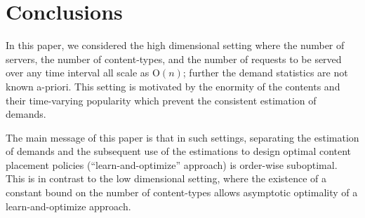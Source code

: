 \documentclass[10pt, conference, letterpaper]{IEEEtran}
\def \OO {\mathrm{O}}
\begin{document}
\section{Conclusions}\label{conclusion}
In this paper, we considered the high dimensional setting where the
number of servers, the number of content-types, and the number of
requests to be served over any time interval all scale as $\OO(n)$;
further the demand statistics are not known a-priori. This setting is
motivated by the enormity of the contents and their time-varying
popularity which prevent the consistent estimation of demands.

The main message of this paper is that in such settings, separating
the estimation of demands and the subsequent use of the estimations to
design optimal content placement policies (``learn-and-optimize''
approach) is order-wise suboptimal. This is in contrast to the
low dimensional setting, where the existence of a constant bound on the
number of content-types allows asymptotic optimality of a
learn-and-optimize approach.






\end{document}
